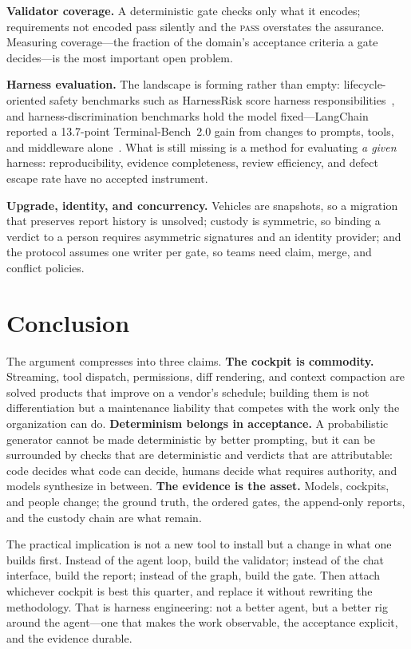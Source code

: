 \documentclass[10pt,a4paper]{article}
\theoremstyle{definition}
\theoremstyle{plain}
\theoremstyle{principle}
\begin{document}
\textbf{Validator coverage.} A deterministic gate checks only what it encodes; requirements not
encoded pass silently and the \textnormal{\textsc{pass}} overstates the assurance. Measuring coverage---the
fraction of the domain's acceptance criteria a gate decides---is the most important open problem.

\textbf{Harness evaluation.} The landscape is forming rather than empty: lifecycle-oriented safety
benchmarks such as HarnessRisk score harness responsibilities~\cite{harnessrisk}, and
harness-discrimination benchmarks hold the model fixed---LangChain reported a 13.7-point
Terminal-Bench~2.0 gain from changes to prompts, tools, and middleware alone~\cite{langchain2026}.
What is still missing is a method for evaluating \emph{a given} harness: reproducibility, evidence
completeness, review efficiency, and defect escape rate have no accepted instrument.

\textbf{Upgrade, identity, and concurrency.} Vehicles are snapshots, so a migration that preserves
report history is unsolved; custody is symmetric, so binding a verdict to a person requires
asymmetric signatures and an identity provider; and the protocol assumes one writer per gate, so
teams need claim, merge, and conflict policies.

\section{Conclusion}\label{sec:conclusion}

The argument compresses into three claims. \textbf{The cockpit is commodity.} Streaming, tool
dispatch, permissions, diff rendering, and context compaction are solved products that improve on a
vendor's schedule; building them is not differentiation but a maintenance liability that competes
with the work only the organization can do. \textbf{Determinism belongs in acceptance.} A
probabilistic generator cannot be made deterministic by better prompting, but it can be surrounded
by checks that are deterministic and verdicts that are attributable: code decides what code can
decide, humans decide what requires authority, and models synthesize in between. \textbf{The
evidence is the asset.} Models, cockpits, and people change; the ground truth, the ordered gates,
the append-only reports, and the custody chain are what remain.

The practical implication is not a new tool to install but a change in what one builds first.
Instead of the agent loop, build the validator; instead of the chat interface, build the report;
instead of the graph, build the gate. Then attach whichever cockpit is best this quarter, and
replace it without rewriting the methodology. That is harness engineering: not a better agent, but
a better rig around the agent---one that makes the work observable, the acceptance explicit, and
the evidence durable.
\end{document}
